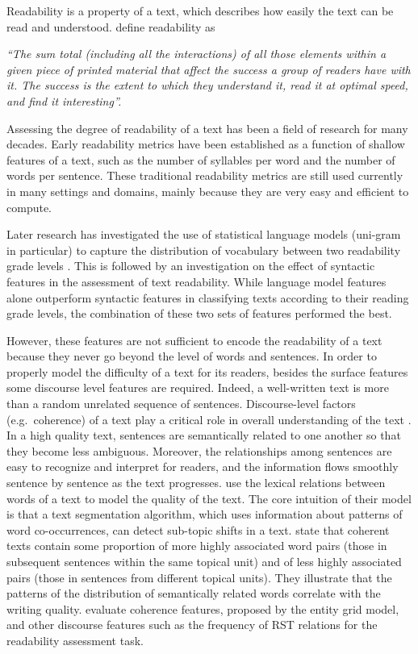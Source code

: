 Readability is a property of a text, which describes how easily the text can be read and understood.  
 define readability as 

\emph{``The sum total (including all the interactions) of all those elements within a given piece of printed material that affect the success a group of readers have with it. 
The success is the extent to which they understand it, read it at optimal speed, and find it interesting''.}

Assessing the degree of readability of a text has been a field of research for many decades. 
Early readability metrics \cite{flesch48,kincaid75} have been established as a function of shallow features of a text, such as the number of syllables per word and the number of words per sentence. 
These traditional readability metrics are still used currently in many settings and domains, mainly because they are very easy and efficient to compute.  

Later research has investigated the use of statistical language models 
(uni-gram in particular) to capture the distribution of vocabulary between two readability grade levels
\cite{siluo01,collins-thompson04}. 
This is followed by an investigation on the effect of syntactic features \cite{schwarm05,heilman07,petersen09} in the assessment of text readability. 
While language model features alone outperform syntactic features in classifying texts according to their reading grade levels, the combination of these two sets of features performed the best. 

However, these features are not sufficient to encode the readability of a text because they never go beyond the level of words and sentences. 
In order to properly model the difficulty of a text for its readers, besides the surface features some discourse level features  are required. 
Indeed, a well-written text is more than a random unrelated sequence of sentences. 
Discourse-level factors (e.g.\ coherence) of a text play a critical role in overall understanding of the text \cite{pitler08}.  
In a high quality text, sentences are semantically related to one another so that they become less ambiguous.   
Moreover, the relationships among sentences are easy to recognize and interpret for readers, and the information flows smoothly sentence by sentence as the text progresses. 
 use the lexical relations between words of a text to model the quality of the text. 
The core intuition of their model is that a text segmentation algorithm, which uses information about patterns of word co-occurrences, can detect sub-topic shifts in a text. 
 state that coherent texts contain some proportion of more highly associated word pairs (those in subsequent sentences within the same topical unit) and of less highly associated pairs (those in sentences from different topical units).  
They illustrate that the patterns of the distribution of semantically related words correlate with the writing quality. 
 evaluate coherence features, proposed by the entity grid model, and other discourse features such as the frequency of RST relations for the readability assessment task.  

